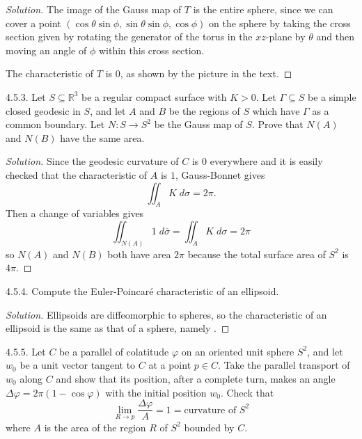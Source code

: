 \documentclass[10pt]{scrartcl}
\providecommand{\ol}{\overline}
\providecommand{\RR}{\mathbb R}
\providecommand{\dif}{\;d}
\newenvironment{soln}{\begin{proof}[Solution]}{\end{proof}}
\begin{document}
\begin{soln}
	The image of the Gauss map of $T$ is the entire sphere,
	since we can cover a point
	$(\cos\theta\sin\phi,\sin\theta\sin\phi,\cos\phi)$
	on the sphere by taking the cross section given by
	rotating the generator of the torus in the $xz$-plane by $\theta$
	and then moving an angle of $\phi$ within this cross section.
	
	The characteristic of $T$ is $0$, as shown by the picture in the text.
\end{soln}

\begin{problem*}4.5.3.
	Let $S\subseteq\RR^3$ be a regular compact surface with $K>0$.
	Let $\Gamma\subseteq S$ be a simple closed geodesic in $S$,
	and let $A$ and $B$ be the regions of $S$ which have $\Gamma$
	as a common boundary. Let $N\colon S\to S^2$ be the Gauss map of $S$.
	Prove that $N(A)$ and $N(B)$ have the same area.
\end{problem*}

\begin{soln}
	Since the geodesic curvature of $C$ is $0$ everywhere
	and it is easily checked that the characteristic of $A$ is $1$,
	Gauss-Bonnet gives
	\[\iint_A K\dif\sigma = 2\pi.\]
	Then a change of variables gives
	\[\iint_{N(A)} 1\dif\ol\sigma = \iint_A K\dif\sigma = 2\pi\]
	so $N(A)$ and $N(B)$ both have area $2\pi$
	because the total surface area of $S^2$ is $4\pi$.
\end{soln}

\begin{problem*}4.5.4.
	Compute the Euler-Poincar\'e characteristic of an ellipsoid.	
\end{problem*}

\begin{soln}
	Ellipsoids are diffeomorphic to spheres, so the characteristic of
	an ellipsoid is the same as that of a sphere, namely .
\end{soln}


\begin{problem*}4.5.5.
	Let $C$ be a parallel of colatitude $\varphi$ on
	an oriented unit sphere $S^2$, and let $w_0$ be
	a unit vector tangent to $C$ at a point $p\in C$.
	Take the parallel transport of $w_0$ along $C$ and show that
	its position, after a complete turn,
	makes an angle $\Delta\varphi = 2\pi(1-\cos\varphi)$
	with the initial position $w_0$. Check that
	\[\lim_{R\to p} \frac{\Delta\varphi}{A} = 1 = \text{curvature of }S^2\]
	where $A$ is the area of the region $R$ of $S^2$ bounded by $C$.
\end{problem*}
\end{document}
